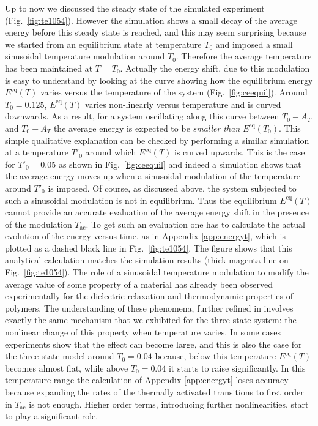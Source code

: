 \documentclass[pre,a4paper,twocolumn,superscriptaddress,%
floatfix]{revtex4}
\newcommand{\tac}{\ensuremath{T_{\mathrm{ac}}}}
\newcommand{\dtac}{\ensuremath{A_T}}
\begin{document}
\medskip
Up to now we discussed the steady state of the simulated experiment
(Fig.~\ref{fig:te1054}). However the simulation shows a small decay of the
average energy before this steady state is reached, and this may seem
surprising because we started from an equilibrium state at temperature $T_0$
and imposed a small sinusoidal temperature modulation around $T_0$. Therefore
the average temperature has been maintained at $T=T_0$. Actually the energy
shift, due to this modulation is easy to understand by looking at the curve
showing how the equilibrium energy $E^{\mathrm{eq}}(T)$
varies versus the temperature of the system (Fig.~\ref{fig:ceequil}).
Around $T_0=0.125$, $E^{\mathrm{eq}}(T)$ varies non-linearly versus
temperature and is curved downwards. As a result, for a system oscillating
along this curve between $T_0 - \dtac$ and $T_0 + \dtac$ the average energy is
expected to be {\em smaller than} $E^{\mathrm{eq}}(T_0)$. This simple
qualitative explanation can be checked by performing a similar simulation at a
temperature $T'_0$ around which $E^{\mathrm{eq}}(T)$ is curved upwards. 
This is the case for $T'_0 = 0.05$ as shown in Fig.~\ref{fig:ceequil} and
indeed a simulation shows that the average energy moves up when a sinusoidal
modulation of the temperature around $T'_0$ is imposed. Of course, as
discussed above, the system subjected to such a sinusoidal modulation is not
in equilibrium. Thus the equilibrium $E^{\mathrm{eq}}(T)$ cannot provide an
accurate evaluation of the average energy shift in the presence of the
modulation $\tac$. To get such an evaluation one has to calculate the actual
evolution of the energy versus time, as in Appendix \ref{app:energyt}, which
is plotted as a dashed black line in Fig.~\ref{fig:te1054}.
The figure shows that
this analytical calculation matches the simulation results (thick
magenta line on
Fig.~\ref{fig:te1054}). The role of a sinusoidal temperature modulation to 
modify the average value of some property of a material
has already been
observed experimentally \cite{JOHARI1999} for the dielectric relaxation and
thermodynamic properties of polymers. The understanding of these phenomena,
further refined in \cite{WANG-JOHARI}
involves exactly the same mechanism that we
exhibited for the three-state system: the nonlinear change of this property when
temperature varies. In some cases experiments show that the effect can become
large, and this is also the case for the three-state model around $T_0 = 0.04$
because, below this temperature $E^{\mathrm{eq}}(T)$ becomes almost flat,
while above $T_0 = 0.04$ it starts to raise significantly. In this temperature
range the calculation of Appendix \ref{app:energyt} loses accuracy because
expanding the rates of the thermally activated transitions to first order in
$\tac$ is not enough. Higher order terms, introducing further nonlinearities,
start to play a significant role.
\end{document}
